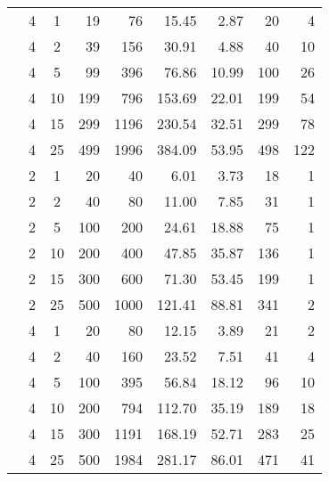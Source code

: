 \documentclass[12pt,a4paper]{article}
\begin{document}
\begin{table}
\begin{center}
\begin{tabular}{cccrrrrrr}
\cellcolor{white}&  4 & 1 &  19 &  76  & 15.45 & 2.87 &  20 &   4 \\ \rowcolor[gray]{0.85}
\cellcolor{white}&  4 & 2 &  39 & 156  & 30.91 & 4.88 &  40 &  10 \\ \rowcolor[gray]{0.85}
\cellcolor{white}&  4 & 5 &  99 & 396  & 76.86 & 10.99 & 100 &  26 \\\rowcolor[gray]{0.85}
\cellcolor{white}&  4 & 10 & 199 & 796  & 153.69 & 22.01 & 199 &  54 \\ \rowcolor[gray]{0.85}
\cellcolor{white}&  4 & 15 & 299 & 1196  & 230.54 & 32.51 & 299 &  78 \\ \rowcolor[gray]{0.85}
\cellcolor{white}\multirow{-12}{*}{\begin{sideways}\textbf{\large equal frequency}\end{sideways}}
&  4 & 25 & 499 & 1996  & 384.09 & 53.95 & 498 & 122 \\ \hline
 
&  2 & 1 &  20 &  40  & 6.01 & 3.73 &  18 &   1 \\ 
&  2 & 2 &  40 &  80  & 11.00 & 7.85 &  31 &   1 \\ 
&  2 & 5 & 100 & 200  & 24.61 & 18.88 &  75 &   1 \\ 
&  2 & 10 & 200 & 400  & 47.85 & 35.87 & 136 &   1 \\ 
&  2 & 15 & 300 & 600  & 71.30 & 53.45 & 199 &   1 \\ 
&  2 & 25 & 500 & 1000  & 121.41 & 88.81 & 341 &   2 \\ \rowcolor[gray]{0.85}
\cellcolor{white} &  4 & 1 &  20 &  80  & 12.15 & 3.89 &  21 &   2 \\ \rowcolor[gray]{0.85}
\cellcolor{white} &  4 & 2 &  40 & 160  & 23.52 & 7.51 &  41 &   4 \\ \rowcolor[gray]{0.85}
\cellcolor{white} &  4 & 5 & 100 & 395  & 56.84 & 18.12 &  96 &  10 \\\rowcolor[gray]{0.85}
\cellcolor{white} &  4 & 10 & 200 & 794  & 112.70 & 35.19 & 189 &  18 \\ \rowcolor[gray]{0.85}
\cellcolor{white} &  4 & 15 & 300 & 1191  & 168.19 & 52.71 & 283 &  25 \\ \rowcolor[gray]{0.85}
\cellcolor{white}\multirow{-12}{*}{\begin{sideways}\textbf{\large equal width}\end{sideways}} &  4 & 25 & 500 & 1984  & 281.17 & 86.01 & 471 &  41 \\ \hline 
\end{tabular}
\end{center}
\end{table}
\end{document}
